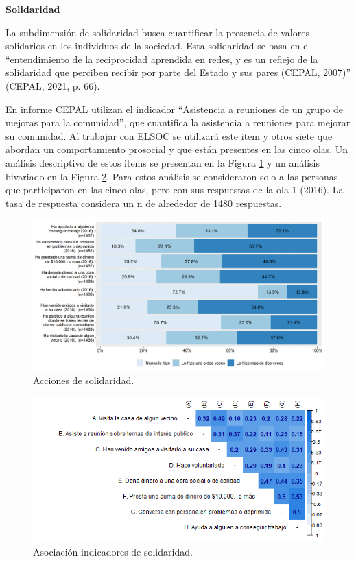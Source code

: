 \documentclass[
  12pt,
]{book}
\begin{document}
\textbf{Solidaridad}

La subdimensión de solidaridad busca cuantificar la presencia de valores solidarios en los individuos de la sociedad. Esta solidaridad se basa en el ``entendimiento de la reciprocidad aprendida en redes, y es un reflejo de la solidaridad que perciben recibir por parte del Estado y sus pares (CEPAL, 2007)'' (CEPAL, \protect\hyperlink{ref-cepal_cohesion_2021}{2021}, p. 66).

En informe CEPAL utilizan el indicador ``Asistencia a reuniones de un grupo de mejoras para la comunidad'', que cuantifica la asistencia a reuniones para mejorar su comunidad. Al trabajar con ELSOC se utilizará este item y otros siete que abordan un comportamiento prosocial y que están presentes en las cinco olas. Un análisis descriptivo de estos items se presentan en la Figura \ref{fig:solidaridad} y un análisis bivariado en la Figura \ref{fig:solidaridad-cor}. Para estos análisis se consideraron solo a las personas que participaron en las cinco olas, pero con sus respuestas de la ola 1 (2016). La tasa de respuesta considera un n de alrededor de 1480 respuestas.

\begin{figure}[H]

{\centering \includegraphics[width=1\linewidth,height=1\textheight]{output/graphs/solidaridad} 

}

\caption{Acciones de solidaridad.}\label{fig:solidaridad}
\end{figure}

\begin{figure}[H]

{\centering \includegraphics[width=1\linewidth,height=1\textheight]{output/graphs/solidaridad_cor} 

}

\caption{Asociación indicadores de solidaridad.}\label{fig:solidaridad-cor}
\end{figure}
\end{document}
